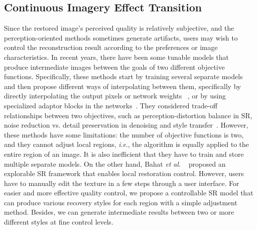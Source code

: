 \documentclass{article}
\newcommand{\etal}{\textit{et al}. }
\newcommand{\ie}{\textit{i}.\textit{e}., }
\begin{document}
\subsection{Continuous Imagery Effect Transition}
Since the restored image's perceived quality is relatively subjective, and the perception-oriented methods sometimes generate artifacts, users may wish to control the reconstruction result according to the preferences or image characteristics. In recent years, there have been some tunable models that produce intermediate images between the goals of two different objective functions. Specifically, these methods start by training several separate models and then propose different ways of interpolating between them, specifically by directly interpolating the output pixels or network weights ~\cite{2018esrgan, wang2019deep}, or by using specialized adaptor blocks in the networks~\cite{shoshan2019dynamic}. They considered trade-off relationships between two objectives, such as perception-distortion balance in SR, noise reduction vs. detail preservation in denoising and style transfer~\cite{he2019modulating,shoshan2019dynamic, wang2019cfsnet, wang2019deep}. However, these methods have some limitations: the number of objective functions is two, and they cannot adjust local regions, \ie the algorithm is equally applied to the entire region of an image. It is also inefficient that they have to train and store multiple separate models. On the other hand, Bahat \etal~\cite{bahat2020explorable} proposed an explorable SR framework that enables local restoration control. However, users have to manually edit the texture in a few steps through a user interface. For easier and more effective quality control, we propose a controllable SR model that can produce various recovery styles for each region with a simple adjustment method. Besides, we can generate intermediate results between two or more different styles at fine control levels.
\end{document}
